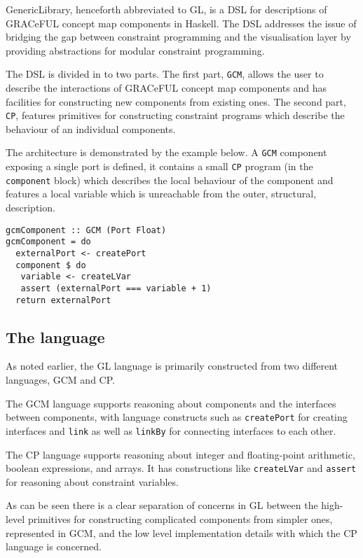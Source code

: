 GenericLibrary, henceforth abbreviated to GL, is a DSL for descriptions
of GRACeFUL concept map components in Haskell. The DSL addresses the issue
of bridging the gap between constraint programming and the visualisation
layer by providing abstractions for modular constraint programming.

The DSL is divided in to two parts. The first part, \texttt{GCM}, allows the user to describe the
interactions of GRACeFUL concept map components and has facilities for
constructing new components from existing ones. The second part,
\texttt{CP}, features primitives for constructing constraint programs
which describe the behaviour of an individual components.

The architecture is demonstrated by the example below. A \texttt{GCM}
component exposing a single port is defined, it contains a small \texttt{CP} program (in the
\texttt{component} block) which describes the local behaviour of the
component and features a local variable which is unreachable from the
outer, structural, description.

\begin{verbatim}
gcmComponent :: GCM (Port Float)
gcmComponent = do
  externalPort <- createPort
  component $ do
   variable <- createLVar
   assert (externalPort === variable + 1)
  return externalPort
\end{verbatim}


\subsection{The language}
As noted earlier, the GL language is primarily constructed from two different languages,
GCM and CP.

The GCM language supports reasoning about components and the interfaces between components,
with language constructs such as \texttt{createPort} for creating interfaces and \texttt{link}
as well as \texttt{linkBy} for connecting interfaces to each other.

The CP language supports reasoning about integer and floating-point arithmetic, boolean expressions,
and arrays. It has constructions like \texttt{createLVar} and \texttt{assert} for reasoning about
constraint variables.

As can be seen there is a clear separation of concerns in GL between the high-level primitives
for constructing complicated components from simpler ones, represented in GCM, and the low level
implementation details with which the CP language is concerned.
